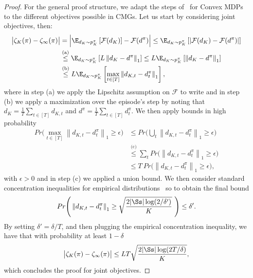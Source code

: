 \begin{proof}
    For the general proof structure, we adapt the steps of~\citet{mutti2023challengingcommonassumptionsconvex} for Convex MDPs to the different objectives possible in CMGs.
    Let us start by considering joint objectives, then:
    \begin{align*}
        \big| \zeta_K(\pi) - \zeta_\infty (\pi) \big|
        &= \Big| \E_{d_K\sim p^{\pi}_K} \left[ \mathcal F (d_K) \right] - \mathcal F (d^{\pi}) \Big| \leq \E_{d_K\sim p^{\pi}_K} \left[ \left| \mathcal F (d_K) - \mathcal F (d^{\pi}) \right| \right] \\
        &\overset{\text{(a)}}{\leq} \E_{d_K\sim p^{\pi}_K} \left[ L \left\| d_K- d^{\pi} \right\|_1 \right] \leq L \E_{d_K\sim p^{\pi}_K} \left[ \left\| d_K- d^{\pi} \right\|_1 \right] \\
        &\overset{\text{(b)}}{\leq}   L \E_{d_K\sim p^{\pi}_K} \left[ \max_{t \in [T]}  \left\| d_{K, t} - d^{\pi}_t \right\|_1 \right],
    \end{align*}
    where in step (a) we apply the Lipschitz assumption on $\mathcal F$ to write and in step (b) we apply a maximization over the episode's step by noting that $d_{K} = \frac{1}{T} \sum_{t \in [T]} d_{K, t}$ and $d^\pi = \frac{1}{T} \sum_{t \in [T]} d^\pi_t$.
    We then apply bounds in high probability
    \begin{align*}
        Pr \Big(  \max_{t \in [T]}  \left\| d_{K, t} - d^{\pi}_t \right\|_1 \geq \epsilon \Big)
        &\leq Pr \Big( \bigcup_{ t} \left\| d_{K, t} - d^{\pi}_t \right\|_1 \geq \epsilon \Big)  \\
        &\overset{\text{(c)}}{\leq}  \sum_{ t} Pr \Big( \left\| d_{K, t} - d^{\pi}_t \right\|_1 \geq \epsilon \Big) \\
        &\leq  T \ Pr \Big( \left\| d_{K, t} - d^{\pi}_t \right\|_1 \geq \epsilon \Big), 
    \end{align*}
    with $\epsilon > 0$ and in step (c) we applied a union bound. We then consider standard concentration inequalities for empirical distributions~\citep{Weissman2003InequalitiesFT} so to obtain the final bound
    \begin{equation}
        Pr \Bigg( \left\| d_{K, t} - d^{\pi}_t \right\|_1 \geq \sqrt{\frac{2|\Ss| \log(2 / \delta')}{K}} \ \Bigg) \leq \delta'. \label{eq:empirical_dist_concentration}
    \end{equation}
    By setting $\delta' = \delta / T$, and then plugging the empirical concentration inequality, we have that with probability at least $1 - \delta$
    \begin{equation*}
        \big| \zeta_K (\pi) - \zeta_\infty (\pi) \big| \leq  L T \sqrt{\frac{2|\Ss| \log(2 T / \delta )}{K}},
    \end{equation*}
    which concludes the proof for joint objectives.


\end{proof}
